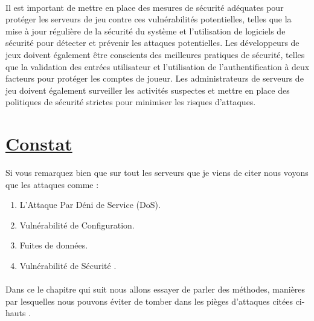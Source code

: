 \paragraph{}
Il est important de mettre en place des mesures de sécurité adéquates pour protéger les serveurs de jeu contre ces vulnérabilités potentielles, telles que la mise à jour régulière de la sécurité du système et l'utilisation de logiciels de sécurité pour détecter et prévenir les attaques potentielles. Les développeurs de jeux doivent également être conscients des meilleures pratiques de sécurité, telles que la validation des entrées utilisateur et l'utilisation de l'authentification à deux facteurs pour protéger les comptes de joueur. Les administrateurs de serveurs de jeu doivent également surveiller les activités suspectes et mettre en place des politiques de sécurité strictes pour minimiser les risques d'attaques.

 \section*{\underline{Constat}}
 Si vous remarquez  bien que sur tout les serveurs que je viens de citer nous voyons que les attaques comme :
 \begin{enumerate}
 	\item L'Attaque Par Déni de Service (DoS).
 	\item Vulnérabilité de Configuration.
 	\item Fuites de données.
 	\item  Vulnérabilité de Sécurité  .
 \end{enumerate}
\paragraph{ }
Dans ce le chapitre qui suit nous allons essayer de parler des méthodes,  manières par lesquelles nous pouvons éviter de tomber  dans les pièges d'attaques citées ci-hauts .
